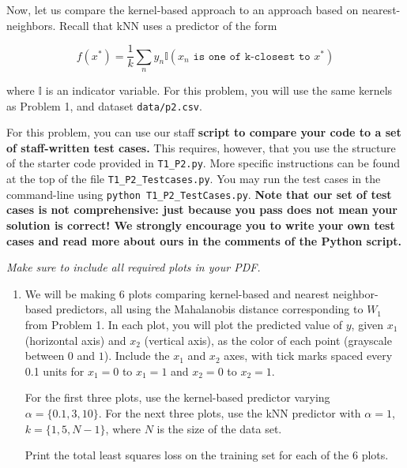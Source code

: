 \documentclass[submit]{harvardml}
\begin{document}
\begin{problem}

Now, let us compare the kernel-based approach to an approach based on
nearest-neighbors.  Recall that kNN uses a predictor of the form

  \begin{equation*}
    f(x^*) = \frac{1}{k} \sum_n y_n \mathbb{I}(x_n \texttt{ is one of k-closest to } x^*)
  \end{equation*}

\noindent where $\mathbb{I}$ is an indicator variable. For this problem, you will use the same kernels as Problem 1, and dataset \verb|data/p2.csv|. 

For this problem, you can use our staff \textbf{script to compare your code to a set of staff-written test cases.} This requires, however, that you use the structure of the starter code provided in \texttt{T1\_P2.py}. More specific instructions can be found at the top of the file \texttt{T1\_P2\_Testcases.py}. You may run the test cases in the command-line using \texttt{python T1\_P2\_TestCases.py}.
\textbf{Note that our set of test cases is not comprehensive: just because you pass does not mean your solution is correct! We strongly encourage you to write your own test cases and read more about ours in the comments of the Python script.}

\vspace{0.5cm}
\noindent\emph{Make sure to include all required plots in your PDF.}


\begin{enumerate}

\item We will be making 6 plots comparing kernel-based and nearest
  neighbor-based predictors, all using the Mahalanobis distance
  corresponding to $W_1$ from Problem 1. In each plot, you will plot
  the predicted value of $y$, given $x_1$ (horizontal axis) and $x_2$
  (vertical axis), as the color of each point (grayscale
  between $0$ and $1$). Include the $x_1$ and $x_2$ axes, with tick marks spaced every 0.1 units
  for $x_1=0$ to $x_1=1$ and $x_2=0$ to $x_2=1$.
  
  For the first three plots, use the kernel-based predictor varying
  $\alpha = \{0.1,3,10\}$.  For the next three plots, use the kNN
  predictor with $\alpha = 1$, $k=\{1,5,N-1\}$, where $N$ is the size
  of the data set.

  Print the total least squares loss on the training set for each of
  the 6 plots.
  

\end{enumerate}
\end{problem}
\end{document}
